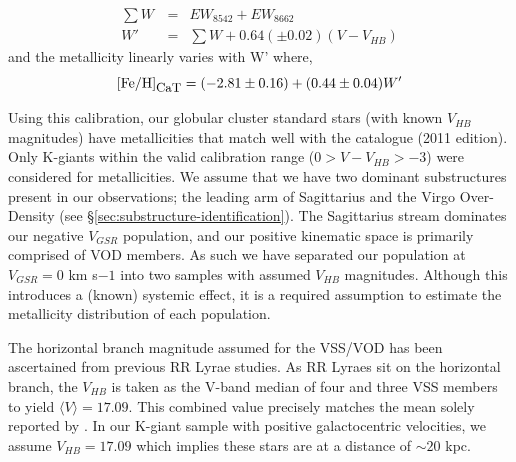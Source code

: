 \documentclass[preprint2]{aastex}
\begin{document}
\begin{eqnarray}
	\textstyle\sum{W}\, &=& EW_{8542} + EW_{8662} \\
	W' &=&\textstyle\sum{W} + 0.64\left(\pm 0.02\right)\left(V-V_{HB}\right)
\end{eqnarray}
\noindent and the metallicity linearly varies with W' where,
\begin{equation}
	\mbox{[Fe/H]}_{\mbox{\small{CaT}}} = (-2.81\pm0.16) + (0.44\pm0.04) W'
	\label{eq:feh-cat}
\end{equation}

Using this calibration, our globular cluster standard stars (with known $V_{HB}$ magnitudes) have metallicities that match well with the \citet{Harris_1996} catalogue (2011 edition). Only K-giants within the valid calibration range ($0 > V-V_{HB} > -3$) were considered for metallicities. We assume that we have two dominant substructures present in our observations; the leading arm of Sagittarius and the Virgo Over-Density (see \S\ref{sec:substructure-identification}). The Sagittarius stream dominates our negative $V_{GSR}$ population, and our positive kinematic space is primarily comprised of VOD members. As such we have separated our population at $V_{GSR} = 0$ km s${-1}$ into two samples with assumed $V_{HB}$ magnitudes. Although this introduces a (known) systemic effect, it is a required assumption to estimate the metallicity distribution of each population.

The horizontal branch magnitude assumed for the VSS/VOD has been ascertained from previous RR Lyrae studies. As RR Lyraes sit on the horizontal branch, the $V_{HB}$ is taken as the V-band median of four \citet{Prior;et-al_2009a} and three  \citet{Duffau;et-al_2006} VSS members to yield $\langle{}V\rangle{} = 17.09$. This combined value precisely matches the mean solely reported by \citet{Duffau;et-al_2006}. In our K-giant sample with positive galactocentric velocities, we assume $V_{HB} = 17.09$ which implies these stars are at a distance of $\sim20$ kpc.
\end{document}
